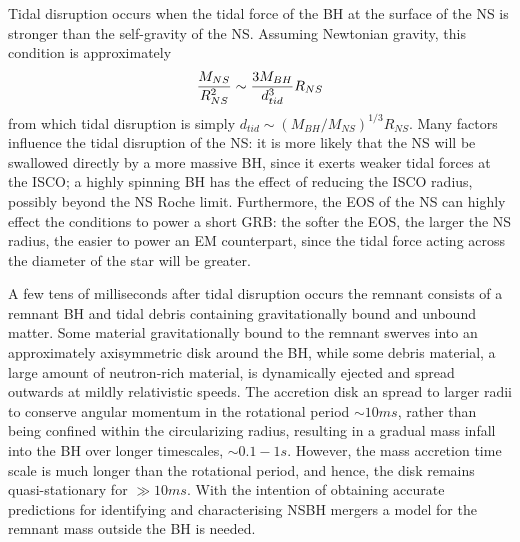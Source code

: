 \documentclass[binding=0.6cm, LaM]{sapthesis}
\begin{document}
        Tidal disruption occurs when the tidal force of the BH at the surface of the NS is stronger
        than the self-gravity of the NS. Assuming Newtonian gravity, this condition is approximately
                \begin{equation}
                        {{M_{NS}} \over {R_{NS}^2}} \sim {{3M_{BH}} \over {d_{tid}^3}}R_{NS}
                \end{equation}
        from which tidal disruption is simply $d_{tid} \sim (M_{BH}/M_{NS})^{1/3}R_{NS}$.
	Many factors influence the  tidal disruption of the NS: 
	it is more likely that the NS will be swallowed directly by a more massive BH, 
	since it exerts weaker tidal forces at the ISCO;
	a highly  spinning BH has the effect of reducing the ISCO radius,
	possibly beyond the NS Roche limit.
	Furthermore, the EOS of the NS can highly effect the conditions to power a short GRB:
	the softer the EOS, the larger the NS radius, the easier to power an EM counterpart,
	since the tidal force acting across the diameter of the star will be greater.

        A few tens of milliseconds after tidal disruption occurs the remnant consists of
        a remnant BH and tidal debris containing gravitationally bound and unbound matter.
        Some material gravitationally bound to the remnant swerves
        into an approximately axisymmetric disk around the BH, while some debris material,
        a large amount of neutron-rich material, is dynamically ejected and spread outwards at mildly relativistic speeds.
	 The accretion disk an spread to larger radii to conserve angular momentum in the rotational period $\sim 10 ms$,
        rather than being confined within the circularizing radius, resulting in a gradual mass infall into the BH over longer timescales, $\sim 0.1-1 s$.
        However, the mass accretion time scale is much longer than the rotational period, and hence, the disk remains quasi-stationary for $\gg 10 ms$.
        With the intention of obtaining accurate predictions for identifying and characterising NSBH mergers
        a model for the remnant mass outside the BH is needed.
\end{document}
